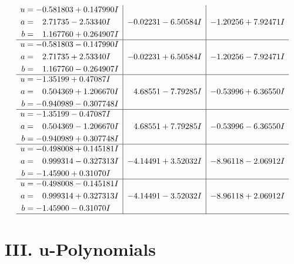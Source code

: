 \documentclass[1p]{elsarticle_modified}
\theoremstyle{definition}
\begin{document}
$$\begin{array}{c|c|c}
\begin{aligned}
u &= -0.581803 + 0.147990 I \\
a &= \phantom{-}2.71735 - 2.53340 I \\
b &= \phantom{-}1.167760 + 0.264907 I\end{aligned}
 & -0.02231 - 6.50584 I & -1.20256 + 7.92471 I \\ \hline\begin{aligned}
u &= -0.581803 - 0.147990 I \\
a &= \phantom{-}2.71735 + 2.53340 I \\
b &= \phantom{-}1.167760 - 0.264907 I\end{aligned}
 & -0.02231 + 6.50584 I & -1.20256 - 7.92471 I \\ \hline\begin{aligned}
u &= -1.35199 + 0.47087 I \\
a &= \phantom{-}0.504369 + 1.206670 I \\
b &= -0.940989 - 0.307748 I\end{aligned}
 & \phantom{-}4.68551 - 7.79285 I & -0.53996 + 6.36550 I \\ \hline\begin{aligned}
u &= -1.35199 - 0.47087 I \\
a &= \phantom{-}0.504369 - 1.206670 I \\
b &= -0.940989 + 0.307748 I\end{aligned}
 & \phantom{-}4.68551 + 7.79285 I & -0.53996 - 6.36550 I \\ \hline\begin{aligned}
u &= -0.498008 + 0.145181 I \\
a &= \phantom{-}0.999314 - 0.327313 I \\
b &= -1.45900 + 0.31070 I\end{aligned}
 & -4.14491 + 3.52032 I & -8.96118 - 2.06912 I \\ \hline\begin{aligned}
u &= -0.498008 - 0.145181 I \\
a &= \phantom{-}0.999314 + 0.327313 I \\
b &= -1.45900 - 0.31070 I\end{aligned}
 & -4.14491 - 3.52032 I & -8.96118 + 2.06912 I\\
 \hline 
 \end{array}$$\newpage
\newpage\renewcommand{\arraystretch}{1}
\centering \section*{ III. u-Polynomials}
\end{document}
